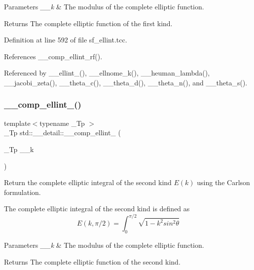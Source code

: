 \begin{DoxyParams}{Parameters}
{\em \+\_\+\+\_\+k} & The modulus of the complete elliptic function. \\
\hline
\end{DoxyParams}
\begin{DoxyReturn}{Returns}
The complete elliptic function of the first kind. 
\end{DoxyReturn}


Definition at line 592 of file sf\+\_\+ellint.\+tcc.



References \+\_\+\+\_\+comp\+\_\+ellint\+\_\+rf().



Referenced by \+\_\+\+\_\+ellint\+\_(), \+\_\+\+\_\+ellnome\+\_\+k(), \+\_\+\+\_\+heuman\+\_\+lambda(), \+\_\+\+\_\+jacobi\+\_\+zeta(), \+\_\+\+\_\+theta\+\_\+c(), \+\_\+\+\_\+theta\+\_\+d(), \+\_\+\+\_\+theta\+\_\+n(), and \+\_\+\+\_\+theta\+\_\+s().

\mbox{\label{namespacestd_1_1____detail_a4836f4db24abd037705100750f82d375}} 
\subsubsection{\texorpdfstring{\+\_\+\+\_\+comp\+\_\+ellint\+\_()}{\_\_comp\_ellint\_2()}}
{\footnotesize\ttfamily template$<$typename \+\_\+\+Tp $>$ \\
\+\_\+\+Tp std\+::\+\_\+\+\_\+detail\+::\+\_\+\+\_\+comp\+\_\+ellint\+\_ (\begin{DoxyParamCaption}\item[{\+\_\+\+Tp}]{\+\_\+\+\_\+k }\end{DoxyParamCaption})}



Return the complete elliptic integral of the second kind $ E(k) $ using the Carlson formulation. 

The complete elliptic integral of the second kind is defined as \[ E(k,\pi/2) = \int_0^{\pi/2}\sqrt{1 - k^2 sin^2\theta} \]


\begin{DoxyParams}{Parameters}
{\em \+\_\+\+\_\+k} & The modulus of the complete elliptic function. \\
\hline
\end{DoxyParams}
\begin{DoxyReturn}{Returns}
The complete elliptic function of the second kind. 
\end{DoxyReturn}


